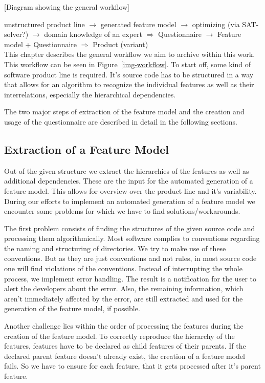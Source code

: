[Diagram showing the general workflow]


unstructured product line $\rightarrow$ generated feature model $\rightarrow$ optimizing (via SAT-solver?) $\rightarrow$ domain knowledge of an expert $\Rightarrow$ Questionnaire $\rightarrow$ Feature model + Questionnaire $\Rightarrow$ Product (variant)\\

This chapter describes the general workflow we aim to archive within this work. This workflow can be seen in Figure~\ref{img-workflow}. To start off, some kind of software product line is required. It's source code has to be structured in a way that allows for an algorithm to recognize the individual features as well as their interrelations, especially the hierarchical dependencies.


The two major steps of extraction of the feature model and the creation and usage of the questionnaire are described in detail in the following sections.


\subsection{Extraction of a Feature Model}
Out of the given structure we extract the hierarchies of the features as well as additional dependencies. These are the input for the automated generation of a feature model. This allows for overview over the product line and it's variability. During our efforts to implement an automated generation of a feature model we encounter some problems for which we have to find solutions/workarounds.

The first problem consists of finding the structures of the given source code and processing them algorithmically. Most software complies to conventions regarding the naming and structuring of directories. We try to make use of these conventions. But as they are just conventions and not rules, in most source code one will find violations of the conventions. Instead of interrupting the whole process, we implement error handling. The result is a notification for the user to alert the developers about the error. Also, the remaining information, which aren't immediately affected by the error, are still extracted and used for the generation of the feature model, if possible.

Another challenge lies within the order of processing the features during the creation of the feature model. To correctly reproduce the hierarchy of the features, features have to be declared as child features of their parents. If the declared parent feature doesn't already exist, the creation of a feature model fails. So we have to ensure for each feature, that it gets processed after it's parent feature.

